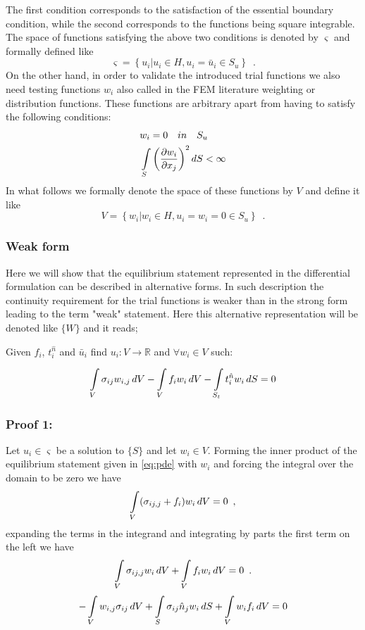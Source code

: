 The first condition corresponds to the satisfaction of the essential boundary condition, while the second corresponds to the functions being square integrable. The space of functions satisfying the above two conditions is denoted by $\varsigma$ and formally defined like
%
\[\varsigma = \left\{u_i\left| {u_i} \in H, {u_i} = \bar{u}_i \in S_u \right. \right\} \enspace .\]
%
On the other hand, in order to validate the introduced trial functions we also need testing functions $w_i$ also called in the FEM literature weighting or distribution functions. These functions are arbitrary apart from having to satisfy the following conditions:
%
\begin{align*}
&w_i = 0 \quad in \quad {S_u}\\
&\int\limits_S \left(\pdv{w_i}{x_j}\right)^2 dS < \infty
\end{align*}
%
In what follows we formally denote the space of these functions by $V$ and define it like
%
\[V = \left\{ w_i\left| w_i \in H, u_i = w_i=0 \in S_u \right. \right\} \enspace .\]

\subsubsection{Weak form}
Here we will show that the equilibrium statement represented in the differential formulation can be described in alternative forms. In such description the continuity requirement for the trial functions is weaker than in the strong form leading to the term "weak" statement. Here this alternative representation will be denoted like $\{W\}$ and it reads;

Given $f_i$, $t_i^{\hat n}$ and ${\bar u_i}$ find ${u_i}:V \to \mathbb{R}$ and $\forall {w_i} \in V$ such:

\[\int\limits_V \sigma _{ij} w_{i,j}\, dV - \int\limits_V f_i w_i\, dV  - \int\limits_{S_t} t_i^{\hat n} w_i\, dS = 0\]

\subsubsection*{Proof 1:}
Let $u_i \in \varsigma $ be a solution to $\{S\}$ and let $w_i \in V $. Forming the inner product of the equilibrium statement given in \cref{eq:pde} with $w_i$ and forcing the integral over the domain to be zero we have
%
\[\int\limits_V (\sigma_{ij,j} + f_i ){w_i}\, dV = 0 \enspace ,\]
%
expanding the terms in the integrand and integrating by parts the first term on the left we have
%
\[\int\limits_V \sigma _{ij,j} w_i\, dV + \int\limits_V f_i w_i\, dV = 0 \enspace .\]
\[ - \int\limits_V w_{i,j} \sigma _{ij}\, dV  + \int\limits_S \sigma _{ij} \hat{n}_j w_i\, dS  + \int\limits\limits_V w_i f_i\, dV = 0 \]

